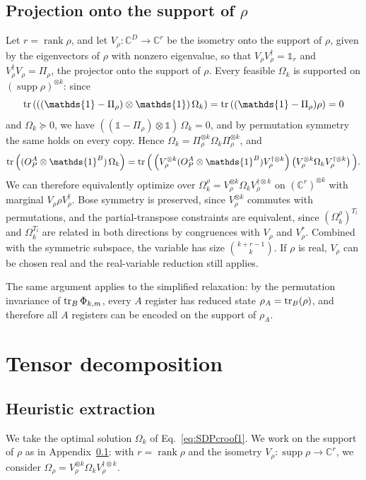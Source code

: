 \documentclass[aps,pra,onecolumn,superscriptaddress]{revtex4-2}
\newcommand{\one}{\mathds{1}}
\newcommand{\I}{\one}
\newcommand{\C}{\mathds{C}}
\begin{document}
\begin{widetext}
\subsection{Projection onto the support of $\rho$}\label{app:supportReduction}
Let $r = \operatorname{rank} \rho$, and let $V_\rho: \C^D \to \C^r$ be the isometry onto the support of $\rho$, given by the eigenvectors of $\rho$ with nonzero eigenvalue, so that $V_\rho V_\rho^\dagger=\I_r$ and $V_\rho^\dagger V_\rho=\Pi_\rho$, the projector onto the support of $\rho$. Every feasible $\Omega_k$ is supported on $(\operatorname{supp}\rho)^{\otimes k}$: since
\begin{equation}
    \tr\left(((\I-\Pi_\rho)\otimes\I)\,\Omega_k\right)=\tr\left((\I-\Pi_\rho)\rho\right)=0
\end{equation}
and $\Omega_k\succeq0$, we have $((\I-\Pi_\rho)\otimes\I)\,\Omega_k=0$, and by permutation symmetry the same holds on every copy. Hence $\Omega_k=\Pi_\rho^{\otimes k}\Omega_k\Pi_\rho^{\otimes k}$, and
\begin{equation}
    \tr\left((O_P^A\otimes\I^B)\,\Omega_k\right)=\tr\Big(\left(V_\rho^{\otimes k}(O_P^A\otimes\I^B)V_\rho^{\dagger\otimes k}\right)\left(V_\rho^{\otimes k}\Omega_kV_\rho^{\dagger\otimes k}\right)\Big).
\end{equation}
We can therefore equivalently optimize over $\Omega_k^\rho=V_\rho^{\otimes k}\Omega_kV_\rho^{\dagger\otimes k}$ on $(\C^r)^{\otimes k}$ with marginal $V_\rho\rho V_\rho^\dagger$. Bose symmetry is preserved, since $V_\rho^{\otimes k}$ commutes with permutations, and the partial-transpose constraints are equivalent, since $(\Omega_k^\rho)^{T_l}$ and $\Omega_k^{T_l}$ are related in both directions by congruences with $V_\rho$ and $V_\rho^*$. Combined with the symmetric subspace, the variable has size $\binom{k+r-1}{k}$. If $\rho$ is real, $V_\rho$ can be chosen real and the real-variable reduction still applies.

The same argument applies to the simplified relaxation: by the permutation invariance of $\tr_B\Phi_{k,m}$, every $A$ register has reduced state $\rho_A=\tr_B(\rho)$, and therefore all $A$ registers can be encoded on the support of $\rho_A$.

\section{Tensor decomposition}
\subsection{Heuristic extraction}\label{app:tensor}
We take the optimal solution $\Omega_k$ of Eq.~\eqref{eq:SDPcroof1}. We work on the support of $\rho$ as in Appendix~\ref{app:supportReduction}: with $r=\operatorname{rank}\rho$ and the isometry $V_\rho:\operatorname{supp}\rho\to\C^r$, we consider $\Omega_\rho=V_\rho^{\otimes k}\Omega_kV_\rho^{\dagger\otimes k}$.


\end{widetext}
\end{document}
